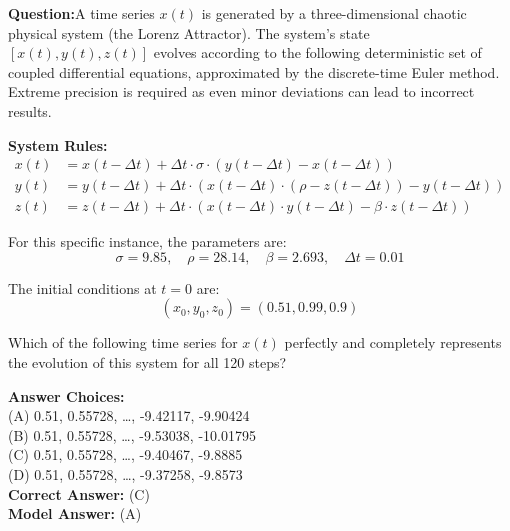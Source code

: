 
\begin{ReasoningBox}[title=Reasoning Error] %
    
        \textbf{Question:}A time series $x(t)$ is generated by a three-dimensional chaotic physical system (the Lorenz Attractor). The system's state $[x(t), y(t), z(t)]$ evolves according to the following deterministic set of coupled differential equations, approximated by the discrete-time Euler method. Extreme precision is required as even minor deviations can lead to incorrect results.

\vspace{0.5em}
\noindent \textbf{System Rules:}
\begin{align*}
    x(t) &= x(t-\Delta t) + \Delta t \cdot \sigma \cdot (y(t-\Delta t) - x(t-\Delta t)) \\
    y(t) &= y(t-\Delta t) + \Delta t \cdot (x(t-\Delta t) \cdot (\rho - z(t-\Delta t)) - y(t-\Delta t)) \\
    z(t) &= z(t-\Delta t) + \Delta t \cdot (x(t-\Delta t) \cdot y(t-\Delta t) - \beta \cdot z(t-\Delta t))
\end{align*}

\noindent For this specific instance, the parameters are:
\[
    \sigma = 9.85, \quad \rho = 28.14, \quad \beta = 2.693, \quad \Delta t = 0.01
\]

\noindent The initial conditions at $t=0$ are:
\[
    (x_0, y_0, z_0) = (0.51, 0.99, 0.9)
\]

\noindent Which of the following time series for $x(t)$ perfectly and completely represents the evolution of this system for all 120 steps?
    

    \vspace{0.5em}

    \textbf{Answer Choices:} \\(A) 0.51, 0.55728, \ldots, -9.42117, -9.90424 \\(B) 0.51, 0.55728, \ldots, -9.53038, -10.01795 \\(C) 0.51, 0.55728, \ldots, -9.40467, -9.8885 \\(D) 0.51, 0.55728, \ldots, -9.37258, -9.8573\\
    \textbf{Correct Answer:} \textcolor{correctgreen}{(C)} \\
    \textbf{Model Answer:} \textcolor{wrongred}{(A)}
    

\end{ReasoningBox}
